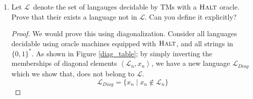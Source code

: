 \documentclass[usletter]{article}
\newcommand {\langset}[1]      {\ensuremath{\mathcal{#1}}}
\newcommand {\machine}[1]      {\ensuremath{\mathscr{#1}}}
\newcommand {\namedlangset}[1] {\ensuremath{\textnormal{\textsc{#1}}}}
\newcommand {\indpar}[1]   {
  \par\leftskip=#1em
  \noindent\ignorespaces
}
\newenvironment{turing}[2] {
  \smallskip
  \indpar{2}
  \textbf{Machine:} #1\\
  \textbf{Input:} $#2$\\[5pt]
  \textbf{begin}
  \parskip=0pt
  \indpar{3}
}{
  \indpar{2}
  \textbf{end}
  \par\medskip
}
\newcommand {\langL}          {\langset{L}}
\newcommand {\machineM}       {\machine{M}}
\begin{document}
\begin{enumerate}
\begin{proof}[Solution]
    By construction, the following observations are immediate:
    \begin{itemize}
      \item $\machine{H}^\alpha_x(k)$ \textit{always} halts; for all inputs $k$
            and regardless of $\alpha$ and $x$.
      \item If $\machineM_\alpha$ \textit{never} halts on $x$;
            then $\machine{H}^\alpha_x(k)$ runs in linear time, for all $k$. \\
            In this case, $\forall k : \machine{H}^\alpha_x(k) = 1$.
      \item If $\machineM_\alpha$ eventually halts on $x$;
            then $\exists l_0 : \forall k : \machine{H}^\alpha_x(k)$ halts in
            at most $l_0$ steps. \\
            In this case, $|k| > l_0 \Rightarrow \machine{H}^\alpha_x(k) = 0$,
            and $\machine{H}^\alpha_x(k) = 1$ otherwise.
    \end{itemize}

    Now, consider the following TM which should decide \namedlangset{Halt},
    assuming the existence of $\machineM_\namedlangset{Const}$ which decides if
    a TM (that always halts), runs in constant time:
    \begin{turing}{$\machineM_\namedlangset{Halt}$}{(\alpha, x)}
      construct the machine $\machine{H}^\alpha_x$ and encode it as $\beta$\\
      return the result of $\machineM_\namedlangset{Const}(\beta)$
    \end{turing}

    Thus, we have decided \namedlangset{Halt} assuming the decidability of
    \namedlangset{Const}. \\
    But we know \namedlangset{Halt} is undecidable.
    Therefore, \namedlangset{Const} \textit{must be} undecidable as well.
  \end{proof}

  \item Let \langL\ denote the set of langauges decidable by TMs with a
        \namedlangset{Halt} oracle.
        Prove that their exists a language not in \langL.
        Can you define it explicitly?
  \begin{proof}
    We would prove this using diagonalization. Consider all languages decidable
    using oracle machines equipped with \namedlangset{Halt}, and all strings in
    $\{0,1\}^*$. As shown in Figure \ref{diag_table}; by simply inverting the
    memberships of diagonal elements $\left< \langL_n,x_n \right>$, we have a
    new language $\langL_{Diag}$ which we show that, does not belong to \langL.
    \begin{equation}
      \label{L_Diag}
      \langL_{Diag} = \{ x_n \mid x_n \not\in \langL_n \}
    \end{equation}


\end{proof}
\end{enumerate}
\end{document}
